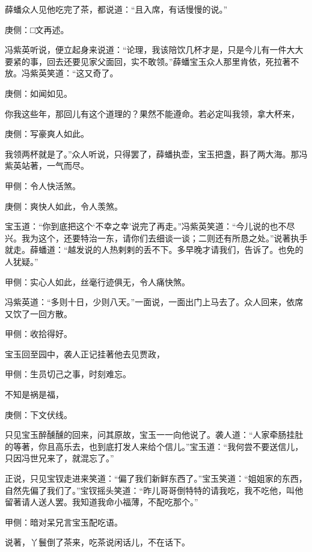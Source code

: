 \begin{parag}
    薛蟠众人见他吃完了茶，都说道：“且入席，有话慢慢的说。”\begin{note}庚侧：□文再述。\end{note}冯紫英听说，便立起身来说道：“论理，我该陪饮几杯才是，只是今儿有一件大大要紧的事，回去还要见家父面回，实不敢领。”薛蟠宝玉众人那里肯依，死拉著不放。冯紫英笑道：“这又奇了。\begin{note}庚侧：如闻如见。\end{note}你我这些年，那回儿有这个道理的？果然不能遵命。若必定叫我领，拿大杯来，\begin{note}庚侧：写豪爽人如此。\end{note}我领两杯就是了。”众人听说，只得罢了，薛蟠执壶，宝玉把盏，斟了两大海。那冯紫英站著，一气而尽。\begin{note}甲侧：令人快活煞。\end{note}\begin{note}庚侧：爽快人如此，令人羡煞。\end{note}宝玉道：“你到底把这个‘不幸之幸’说完了再走。”冯紫英笑道：“今儿说的也不尽兴。我为这个，还要特治一东，请你们去细谈一谈；二则还有所恳之处。”说著执手就走。薛蟠道：“越发说的人热剌剌的丢不下。多早晚才请我们，告诉了。也免的人犹疑。”\begin{note}甲侧：实心人如此，丝毫行迹俱无，令人痛快煞。\end{note}冯紫英道：“多则十日，少则八天。”一面说，一面出门上马去了。众人回来，依席又饮了一回方散。\begin{note}甲侧：收拾得好。\end{note}
\end{parag}


\begin{parag}
    宝玉回至园中，袭人正记挂著他去见贾政，\begin{note}甲侧：生员切己之事，时刻难忘。\end{note}不知是祸是福，\begin{note}庚侧：下文伏线。\end{note}只见宝玉醉醺醺的回来，问其原故，宝玉一一向他说了。袭人道：“人家牵肠挂肚的等著，你且高乐去，也到底打发人来给个信儿。”宝玉道：“我何尝不要送信儿，只因冯世兄来了，就混忘了。”
\end{parag}


\begin{parag}
    正说，只见宝钗走进来笑道：“偏了我们新鲜东西了。”宝玉笑道：“姐姐家的东西，自然先偏了我们了。”宝钗摇头笑道：“昨儿哥哥倒特特的请我吃，我不吃他，叫他留著请人送人罢。我知道我命小福薄，不配吃那个。”\begin{note}甲侧：暗对呆兄言宝玉配吃语。\end{note}说著，丫鬟倒了茶来，吃茶说闲话儿，不在话下。
\end{parag}


